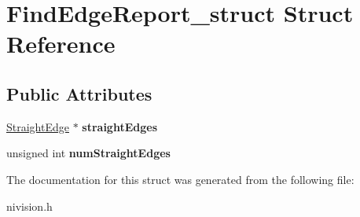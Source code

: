 \hypertarget{structFindEdgeReport__struct}{
\section{FindEdgeReport\_\-struct Struct Reference}
\label{structFindEdgeReport__struct}
}
\subsection*{Public Attributes}
\begin{DoxyCompactItemize}
\item 
\hypertarget{structFindEdgeReport__struct_a7be8c77d23e21997f2654bfe152a5e6d}{
\hyperlink{structStraightEdge__struct}{StraightEdge} $\ast$ {\bfseries straightEdges}}
\label{structFindEdgeReport__struct_a7be8c77d23e21997f2654bfe152a5e6d}

\item 
\hypertarget{structFindEdgeReport__struct_a2dda46c37ccc8c30ca18f0bf3925713c}{
unsigned int {\bfseries numStraightEdges}}
\label{structFindEdgeReport__struct_a2dda46c37ccc8c30ca18f0bf3925713c}

\end{DoxyCompactItemize}


The documentation for this struct was generated from the following file:\begin{DoxyCompactItemize}
\item 
nivision.h\end{DoxyCompactItemize}
